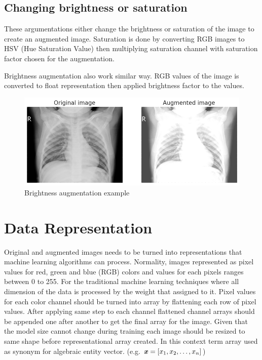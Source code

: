 \subsection{Changing brightness or saturation}
These argumentations either change the brightness or saturation of the image to create an augmented image.
Saturation is done by converting RGB images to HSV (Hue Saturation Value) then multiplying saturation channel with saturation factor chosen for the augmentation.

Brightness augmentation also work similar way.
RGB values of the image is converted to float representation then applied brightness factor to the values.

\begin{figure}[H]
    \centering
    \includegraphics[width=\textwidth]{img/augmented-image-1596666691.png}
    \caption{Brightness augmentation example}
    \label{fig:brightedxray}
\end{figure}


\section{Data Representation}
Original and augmented images needs to be turned into representations that machine learning algorithms can process.
Normality, images represented as pixel values for red, green and blue (RGB) colors and values for each pixels ranges between 0 to 255.
For the traditional machine learning techniques where all dimension of the data is processed by the weight that assigned to it.
Pixel values for each color channel should be turned into array by flattening each row of pixel values.
After applying same step to each channel flattened channel arrays should be appended one after another to get the final array for the image.
Given that the model size cannot change during training each image should be resized to same shape before representational array created.
In this context term array used as synonym for algebraic entity vector. (e.g. $\textbf{\textit{x}} = [x_1, x_2, \ldots, x_n]$)


